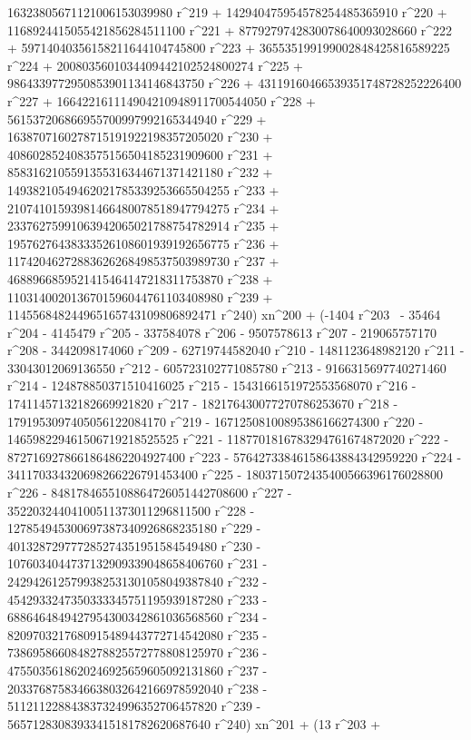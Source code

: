        16323805671121006153039980 r^219 + 
       142940475954578254485365910 r^220 + 
       1168924415055421856284511100 r^221 + 
       8779279742830078640093028660 r^222 + 
       59714040356158211644104745800 r^223 + 
       365535199199002848425816589225 r^224 + 
       2008035601034409442102524800274 r^225 + 
       9864339772950853901134146843750 r^226 + 
       43119160466539351748728252226400 r^227 + 
       166422161114904210948911700544050 r^228 + 
       561537206866955700997992165344940 r^229 + 
       1638707160278715191922198357205020 r^230 + 
       4086028524083575156504185231909600 r^231 + 
       8583162105591355316344671371421180 r^232 + 
       14938210549462021785339253665504255 r^233 + 
       21074101593981466480078518947794275 r^234 + 
       23376275991063942065021788754782914 r^235 + 
       19576276438333526108601939192656775 r^236 + 
       11742046272883626268498537503989730 r^237 + 
       4688966859521415464147218311753870 r^238 + 
       1103140020136701596044761103408980 r^239 + 
       114556848244965165743109806892471 r^240) xn^200 + (-1404 r^203 \
- 35464 r^204 - 4145479 r^205 - 337584078 r^206 - 9507578613 r^207 - 
       219065757170 r^208 - 3442098174060 r^209 - 
       62719744582040 r^210 - 1481123648982120 r^211 - 
       33043012069136550 r^212 - 605723102771085780 r^213 - 
       9166315697740271460 r^214 - 124878850371510416025 r^215 - 
       1543166151972553568070 r^216 - 17411457132182669921820 r^217 - 
       182176430077270786253670 r^218 - 
       1791953097405056122084170 r^219 - 
       16712508100895386166274300 r^220 - 
       146598229461506719218525525 r^221 - 
       1187701816783294761674872020 r^222 - 
       8727169278661864862204927400 r^223 - 
       57642733846158643884342959220 r^224 - 
       341170334320698266226791453400 r^225 - 
       1803715072435400566396176028800 r^226 - 
       8481784655108864726051442708600 r^227 - 
       35220324404100511373011296811500 r^228 - 
       127854945300697387340926868235180 r^229 - 
       401328729777285274351951584549480 r^230 - 
       1076034044737132909339048658406760 r^231 - 
       2429426125799382531301058049387840 r^232 - 
       4542933247350333345751195939187280 r^233 - 
       6886464849427954300342861036568560 r^234 - 
       8209703217680915489443772714542080 r^235 - 
       7386958660848278825572778808125970 r^236 - 
       4755035618620246925659605092131860 r^237 - 
       2033768758346638032642166978592040 r^238 - 
       511211228843837324996352706457820 r^239 - 
       56571283083933415181782620687640 r^240) xn^201 + (13 r^203 + 
